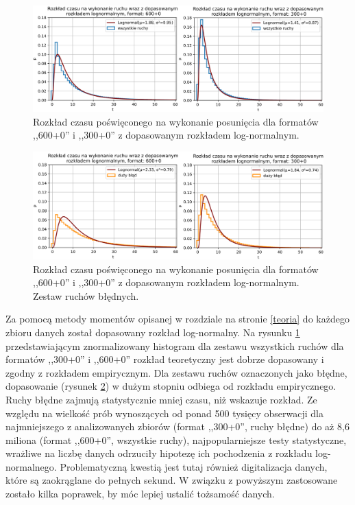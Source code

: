 \documentclass[inzynierska]{pwr_wmat_praca_dyplomowa}
\theoremstyle{plain}
\numberwithin{theorem}{chapter}
\theoremstyle{definition}
\numberwithin{theorem}{chapter}
\begin{document}
\begin{figure}[h]
	\centering
	\includegraphics[width=\textwidth]{rozklad_lognorm.png}
	\caption{Rozkład czasu poświęconego na wykonanie posunięcia dla formatów ,,600+0'' i ,,300+0'' z dopasowanym rozkładem log-normalnym.}
	\label{rys:rozklad_lognorm}
\end{figure}
\begin{figure}[h]
	\centering
	\includegraphics[width=\textwidth]{rozklad_lognorm2.png}
	\caption{Rozkład czasu poświęconego na wykonanie posunięcia dla formatów ,,600+0'' i ,,300+0'' z dopasowanym rozkładem log-normalnym. Zestaw ruchów błędnych.}
	\label{rys:rozklad_lognorm2}
\end{figure}
Za pomocą metody momentów opisanej w rozdziale na stronie \ref{teoria} do każdego zbioru danych został dopasowany rozkład log-normalny. Na rysunku \ref{rys:rozklad_lognorm} przedstawiającym znormalizowany histogram dla zestawu wszystkich ruchów dla formatów ,,300+0'' i ,,600+0'' rozkład teoretyczny jest dobrze dopasowany i zgodny z rozkładem empirycznym. Dla zestawu ruchów oznaczonych jako błędne, dopasowanie (rysunek \ref{rys:rozklad_lognorm2}) w dużym stopniu odbiega od rozkładu empirycznego. Ruchy błędne zajmują statystycznie mniej czasu, niż wskazuje rozkład. Ze względu na wielkość prób wynoszących od ponad 500 tysięcy obserwacji dla najmniejszego z analizowanych zbiorów (format ,,300+0'', ruchy błędne) do aż 8,6 miliona (format ,,600+0'', wszystkie ruchy), najpopularniejsze testy statystyczne, wrażliwe na liczbę danych odrzuciły hipotezę ich pochodzenia z rozkładu log-normalnego. Problematyczną kwestią jest tutaj również digitalizacja danych, które są zaokrąglane do pełnych sekund. W związku z powyższym zastosowane zostało kilka poprawek, by móc lepiej ustalić tożsamość danych.
\end{document}
